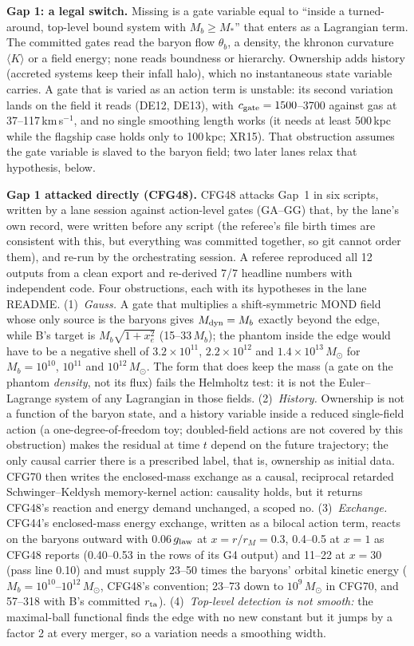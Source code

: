 \documentclass[10pt]{article}
\begin{document}
\textbf{Gap 1: a legal switch.} Missing is a gate variable equal to ``inside a turned-around, top-level bound system with $M_b\ge M_*$'' that enters as a Lagrangian term. The committed gates read the baryon flow $\theta_b$, a density, the khronon curvature $\langle K\rangle$ or a field energy; none reads boundness or hierarchy. Ownership adds history (accreted systems keep their infall halo), which no instantaneous state variable carries. A gate that is varied as an action term is unstable: its second variation lands on the field it reads (DE12, DE13), with $c_{\rm gate}=1500$--3700 against gas at 37--117\,km\,s$^{-1}$, and no single smoothing length works (it needs at least 500\,kpc while the flagship case holds only to 100\,kpc; XR15). That obstruction assumes the gate variable is slaved to the baryon field; two later lanes relax that hypothesis, below.

\textbf{Gap 1 attacked directly (CFG48).} CFG48 attacks Gap~1 in six scripts, written by a lane session against action-level gates (GA--GG) that, by the lane's own record, were written before any script (the referee's file birth times are consistent with this, but everything was committed together, so git cannot order them), and re-run by the orchestrating session. A referee reproduced all 12 outputs from a clean export and re-derived 7/7 headline numbers with independent code. Four obstructions, each with its hypotheses in the lane README. (1)~\emph{Gauss.} A gate that multiplies a shift-symmetric MOND field whose only source is the baryons gives $M_{\rm dyn}=M_b$ exactly beyond the edge, while B's target is $M_b\sqrt{1+x_e^2}$ (15--33\,$M_b$); the phantom inside the edge would have to be a negative shell of $3.2\times10^{11}$, $2.2\times10^{12}$ and $1.4\times10^{13}\,M_\odot$ for $M_b=10^{10}$, $10^{11}$ and $10^{12}\,M_\odot$. The form that does keep the mass (a gate on the phantom \emph{density}, not its flux) fails the Helmholtz test: it is not the Euler--Lagrange system of any Lagrangian in those fields. (2)~\emph{History.} Ownership is not a function of the baryon state, and a history variable inside a reduced single-field action (a one-degree-of-freedom toy; doubled-field actions are not covered by this obstruction) makes the residual at time $t$ depend on the future trajectory; the only causal carrier there is a prescribed label, that is, ownership as initial data. CFG70 then writes the enclosed-mass exchange as a causal, reciprocal retarded Schwinger--Keldysh memory-kernel action: causality holds, but it returns CFG48's reaction and energy demand unchanged, a scoped no. (3)~\emph{Exchange.} CFG44's enclosed-mass energy exchange, written as a bilocal action term, reacts on the baryons outward with 0.06\,$g_{\rm law}$ at $x=r/r_M=0.3$, 0.4--0.5 at $x=1$ as CFG48 reports (0.40--0.53 in the rows of its G4 output) and 11--22 at $x=30$ (pass line 0.10) and must supply 23--50 times the baryons' orbital kinetic energy ($M_b=10^{10}$--$10^{12}\,M_\odot$, CFG48's convention; 23--73 down to $10^9\,M_\odot$ in CFG70, and 57--318 with B's committed $r_{\rm ta}$). (4)~\emph{Top-level detection is not smooth:} the maximal-ball functional finds the edge with no new constant but it jumps by a factor 2 at every merger, so a variation needs a smoothing width.
\end{document}
